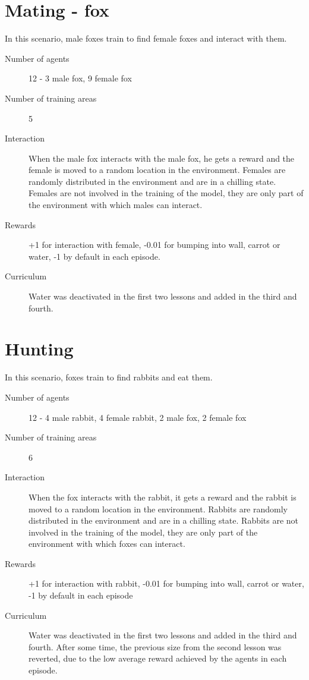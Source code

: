 \section{Mating - fox}
In this scenario, male foxes train to find female foxes and interact with them.
\begin{description}
    \item[Number of agents] 12 - 3 male fox, 9 female fox
    \item[Number of training areas] 5
    \item[Interaction] When the male fox interacts with the male fox, he gets a reward and the female is moved to a random location in the environment. Females are randomly distributed in the environment and are in a chilling state. Females are not involved in the training of the model, they are only part of the environment with which males can interact.
    \item[Rewards] +1 for interaction with female, -0.01 for bumping into wall, carrot or water, -1 by default in each episode.
    \item[Curriculum] Water was deactivated in the first two lessons and added in the third and fourth.
\end{description}

\section{Hunting}
In this scenario, foxes train to find rabbits and eat them.
\begin{description}
    \item[Number of agents] 12 - 4 male rabbit, 4 female rabbit, 2 male fox, 2 female fox
    \item[Number of training areas] 6
    \item[Interaction] When the fox interacts with the rabbit, it gets a reward and the rabbit is moved to a random location in the environment. Rabbits are randomly distributed in the environment and are in a chilling state. Rabbits are not involved in the training of the model, they are only part of the environment with which foxes can interact.
    \item[Rewards] +1 for interaction with rabbit, -0.01 for bumping into wall, carrot or water, -1 by default in each episode
    \item[Curriculum] Water was deactivated in the first two lessons and added in the third and fourth. After some time, the previous size from the second lesson was reverted, due to the low average reward achieved by the agents in each episode.
\end{description}

